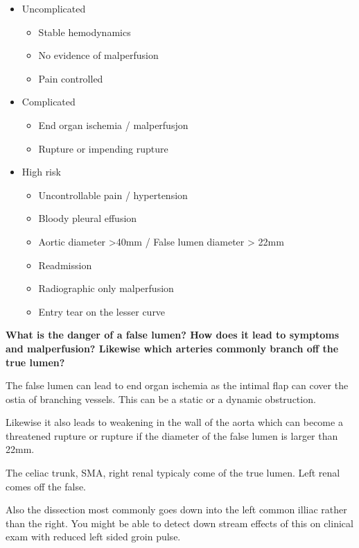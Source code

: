 \documentclass[
]{book}
\begin{document}
\begin{itemize}
\item
  Uncomplicated~

  \begin{itemize}
  \item
    Stable hemodynamics~
  \item
    No evidence of malperfusion
  \item
    Pain controlled~
  \end{itemize}
\item
  Complicated~

  \begin{itemize}
  \item
    End organ ischemia / malperfusjon
  \item
    Rupture or impending rupture
  \end{itemize}
\item
  High risk~

  \begin{itemize}
  \item
    Uncontrollable pain / hypertension~
  \item
    Bloody pleural effusion
  \item
    Aortic diameter \textgreater40mm / False lumen diameter \textgreater{} 22mm
  \item
    Readmission
  \item
    Radiographic only malperfusion~
  \item
    Entry tear on the lesser curve
  \end{itemize}
\end{itemize}

\textbf{What is the danger of a false lumen? How does it lead to symptoms and
malperfusion? Likewise which arteries commonly branch off the true
lumen?}

The false lumen can lead to end organ ischemia as the intimal flap can
cover the ostia of branching vessels. This can be a static or a dynamic
obstruction.

Likewise it also leads to weakening in the wall of the aorta which can
become a threatened rupture or rupture if the diameter of the false
lumen is larger than 22mm.~

The celiac trunk, SMA, right renal typicaly come of the true lumen. Left
renal comes off the false.~

Also the dissection most commonly goes down into the left common illiac
rather than the right. You might be able to detect down stream effects
of this on clinical exam with reduced left sided groin pulse.
\end{document}
